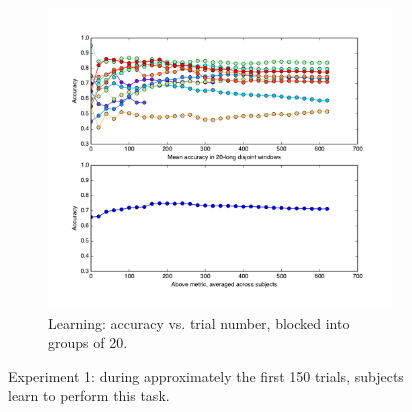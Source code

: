 \begin{figure}[htb]
\centering
\begin{subfigure}[b]{\textwidth}
\centering
                \includegraphics[width=12cm]{img/fig_fire3accuracyWalkingWindow.pdf}
                \caption{Learning: accuracy vs. trial number, blocked into groups of 20.}
      		\label{f:e1:learn}
        \end{subfigure}
\caption{Experiment 1: during approximately the first 150 trials, subjects learn to perform this task.}
\end{figure}